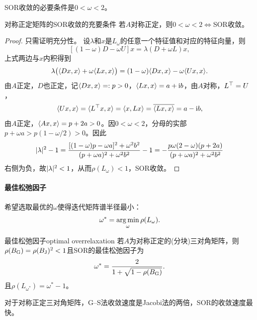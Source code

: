 \begin{corollary}
    SOR收敛的必要条件是$0 < \omega < 2$。
\end{corollary}

\begin{theorem}
    {对称正定矩阵的SOR收敛的充要条件}{}
    若$A$对称正定，则$0 < \omega < 2 \iff$SOR收敛。
\end{theorem}

\begin{proof}
    只需证明充分性。
    设$\lambda$和$x$是$L_\omega$的任意一个特征值和对应的特征向量，则
    \[
        [(1 - \omega)D - \omega U]x = \lambda(D + \omega L)x,
    \]
    上式两边与$x$内积得到
    \[
        \lambda\bigl(\langle Dx,x\rangle + \omega\langle Lx,x\rangle\bigr) = (1 - \omega)\langle Dx,x\rangle - \omega\langle Ux,x\rangle.
    \]
    由$A$正定，$D$也正定，记$\langle Dx,x\rangle =: p > 0$，$\langle Lx,x\rangle = a + \mathrm{i} b$，由$A$对称，$L^\top = U$，
    \[
        \langle Ux,x\rangle = \langle L^\top x,x\rangle = \langle x,Lx\rangle = \overline{\langle Lx,x\rangle} = a - \mathrm{i} b,
    \]
    由$A$正定，$\langle Ax,x\rangle = p + 2a > 0$。因$0 < \omega < 2$，分母的实部$p + \omega a > p(1 - \omega/2) > 0$。因此
    \[
        \lvert\lambda\rvert^2 - 1 = \frac{[(1 - \omega)p - \omega a]^2 + \omega^2b^2}{(p + \omega a)^2 + \omega^2b^2} - 1 = -\frac{p\omega(2 - \omega)(p + 2a)}{(p + \omega a)^2 + \omega^2b^2}
    \]
    右侧为负，故$\lvert\lambda\rvert^2 < 1$，从而$\rho(L_\omega) < 1$，SOR收敛。
\end{proof}

\paragraph{最佳松弛因子}

希望选取最优的$\omega$使得迭代矩阵谱半径最小：
\begin{equation}
    \omega^* = \operatorname*{arg\,min}_{\omega}\rho(L_\omega).
\end{equation}

\begin{theorem}
    {最佳松弛因子}{optimal overrelaxation}
    若$A$为对称正定的(分块)三对角矩阵，则$\rho(B_\text G) = \rho(B_\text J)^2 < 1$且SOR的最佳松弛因子为
    \begin{equation}
        \omega^* = \frac2{1 + \sqrt{1 - \rho(B_\text G)}}.
    \end{equation}
    且$\rho(L_{\omega^*}) = \omega^* - 1$。
\end{theorem}

\begin{remark}
    对于对称正定三对角矩阵，G--S法收敛速度是Jacobi法的两倍，SOR的收敛速度最快。
\end{remark}

